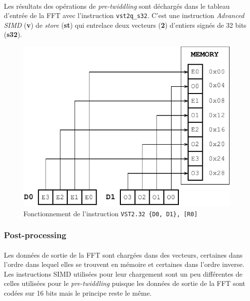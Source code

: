 \documentclass{article}
\begin{document}
    \paragraph{}
    Les résultats des opérations de \emph{pre-twiddling} sont déchargés dans le tableau d'entrée de la FFT avec l'instruction \texttt{vst2q\_s32}. C'est une instruction \emph{Advanced SIMD} (\textbf{v}) de \emph{store} (\textbf{st}) qui entrelace deux vecteurs (\textbf{2}) d'entiers signés de 32 bits (\textbf{s32}).
    \begin{figure}[H]
        \centering
        \includegraphics[width=.6\linewidth]{./images/vst2_s32.pdf}
        \caption{Fonctionnement de l'instruction \texttt{VST2.32 \{D0, D1\}, [R0]}}
        \label{fig:vst2_s32}
    \end{figure}


    \subsubsection{Post-processing}
    \paragraph{}
    Les données de sortie de la FFT sont chargées dans des vecteurs, certaines dans l'ordre dans lequel elles se trouvent en mémoire et certaines dans l'ordre inverse. Les instructions SIMD utilisées pour leur chargement sont un peu différentes de celles utilisées pour le \emph{pre-twiddling} puisque les données de sortie de la FFT sont codées sur 16 bits mais le principe reste le même.
\end{document}
